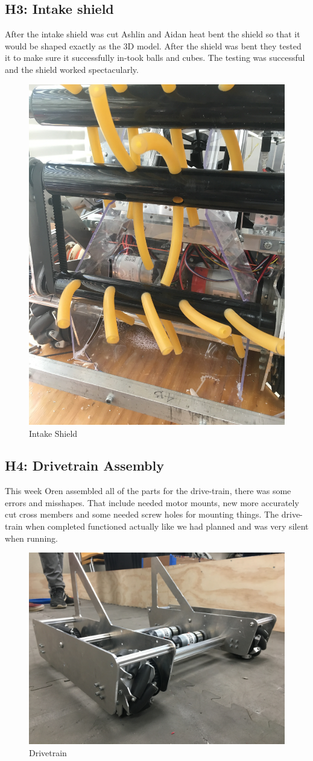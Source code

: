 \documentclass{article}
\begin{document}
\subsection{H3: Intake shield}

After the intake shield was cut Ashlin and Aidan heat bent the shield so that it would be shaped exactly as the 3D model. After the shield was bent they tested it to make sure it successfully in-took balls and cubes. The testing was successful and the shield worked  spectacularly.

\begin{figure}
    \centering
    \includegraphics[width=.6\textwidth, angle=270]{10_11-05/images/intake_shield.JPG}
    \caption{Intake Shield}
    \label{fig:Intake Shield}
\end{figure}

\subsection{H4: Drivetrain Assembly}

This week Oren assembled all of the parts for the drive-train, there was some errors and misshapes. That include needed motor mounts, new more accurately cut cross members and some needed   screw holes for mounting things. The drive-train when completed functioned actually like we had planned and was very silent when running.    

\begin{figure}
    \centering
    \includegraphics[width=.6 \textwidth]{10_11-05/images/drivetrain.JPG}
    \caption{Drivetrain}
    \label{fig:drivetrain}
\end{figure}
\end{document}
